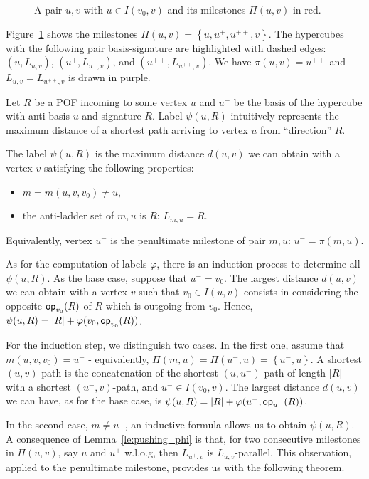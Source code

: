 \documentclass[a4paper,UKenglish,numberwithinsect,cleveref, autoref]{lipics-v2021}
\newcommand{\set}[1]{\left\{ #1 \right\}}
\newcommand{\card}[1]{\left| #1 \right|}
\newcommand{\opp}{\mbox{\textsf{op}}}
\begin{document}
\begin{figure}[h]
\centering
\scalebox{0.9}{}
\caption{A pair $u,v$ with $u \in I(v_0,v)$ and its milestones $\Pi(u,v)$ in red.}
\label{fig:milestones}
\end{figure}

Figure~\ref{fig:milestones} shows the milestones $\Pi(u,v) = \set{u,u^+,u^{++},v}$. The hypercubes with the following pair basis-signature are highlighted with dashed edges: $(u,L_{u,v})$, $(u^+,L_{u^+,v})$, and $(u^{++},L_{u^{++},v})$. We have $\overline{\pi}(u,v) = u^{++}$ and $\overline{L}_{u,v} = L_{u^{++},v}$ is drawn in purple.

Let $R$ be a POF incoming to some vertex $u$ and $u^-$ be the basis of the hypercube with anti-basis $u$ and signature $R$.  Label $\psi(u,R)$ intuitively represents the maximum distance of a shortest path arriving to vertex $u$ from ``direction'' $R$. 

\begin{definition}
The label $\psi(u,R)$ is the maximum distance $d(u,v)$ we can obtain with a vertex $v$ satisfying the following properties:
\begin{itemize}
\item $m = m(u,v,v_0) \neq u$,
\item the anti-ladder set of $m,u$ is $R$: $\overline{L}_{m,u} = R$.
\end{itemize}
Equivalently, vertex $u^-$ is the penultimate milestone of pair $m,u$: $u^- = \overline{\pi}(m,u)$.
\label{def:psi}
\end{definition}

As for the computation of labels $\varphi$, there is an induction process to determine all $\psi(u,R)$. As the base case, suppose that $u^- = v_0$. The largest distance $d(u,v)$ we can obtain with a vertex $v$ such that $v_0 \in I(u,v)$ consists in considering the opposite $\opp_{v_0}(R)$ of $R$ which is outgoing from $v_0$. Hence, $\psi(u,R) = \card{R} + \varphi(v_0,\opp_{v_0}(R))$.

For the induction step, we distinguish two cases. In the first one, assume that $m(u,v,v_0) = u^-$ - equivalently, $\Pi(m,u) = \Pi(u^-,u) = \set{u^-,u}$. A shortest $(u,v)$-path is the concatenation of the shortest $(u,u^-)$-path of length $\card{R}$ with a shortest $(u^-,v)$-path, and $u^- \in I(v_0,v)$. The largest distance $d(u,v)$ we can have, as for the base case, is $\psi(u,R) = \card{R} + \varphi(u^-,\opp_{u^-}(R))$.

In the second case, $m \neq u^-$, an inductive formula allows us to obtain $\psi(u,R)$. A consequence of Lemma~\ref{le:pushing_phi} is that, for two consecutive milestones in $\Pi(u,v)$, say $u$ and $u^+$ w.l.o.g, then $L_{u^+,v}$ is $L_{u,v}$-parallel. This observation, applied to the penultimate milestone, provides us with the following theorem.
\end{document}
